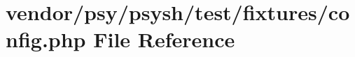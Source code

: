\section{vendor/psy/psysh/test/fixtures/config.php File Reference}
\label{psy_2psysh_2test_2fixtures_2_config_8php}
